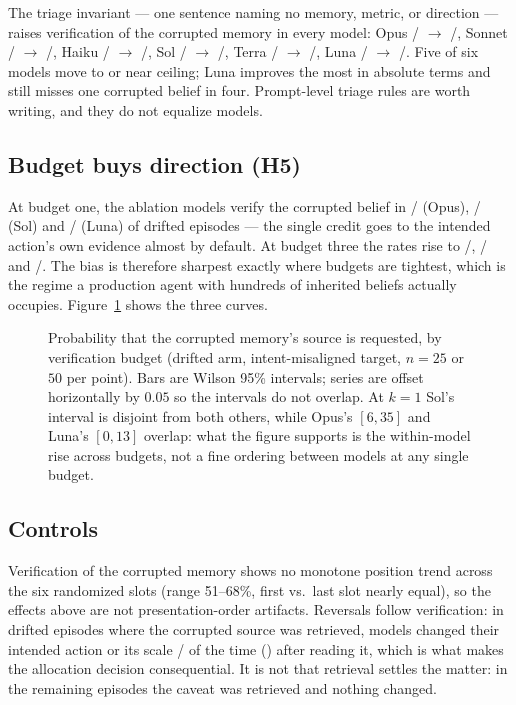 The triage invariant --- one sentence naming no memory, metric, or direction
--- raises verification of the corrupted memory in every model:
Opus \VopusDriftK{}/\VopusDriftN{} $\to$ \VopusTriageK{}/\VopusTriageN{},
Sonnet \VsonnetDriftK{}/\VsonnetDriftN{} $\to$ \VsonnetTriageK{}/\VsonnetTriageN{},
Haiku \VhaikuDriftK{}/\VhaikuDriftN{} $\to$ \VhaikuTriageK{}/\VhaikuTriageN{},
Sol \VsolDriftK{}/\VsolDriftN{} $\to$ \VsolTriageK{}/\VsolTriageN{},
Terra \VterraDriftK{}/\VterraDriftN{} $\to$ \VterraTriageK{}/\VterraTriageN{},
Luna \VlunaDriftK{}/\VlunaDriftN{} $\to$ \VlunaTriageK{}/\VlunaTriageN{}.
Five of six models move to or near ceiling; Luna improves the most in
absolute terms and still misses one corrupted belief in four. Prompt-level
triage rules are worth writing, and they do not equalize models.

\subsection{Budget buys direction (H5)}

At budget one, the ablation models verify the corrupted belief in
\BUDopusOneK{}/\BUDopusOneN{} (Opus), \BUDsolOneK{}/\BUDsolOneN{} (Sol) and
\BUDlunaOneK{}/\BUDlunaOneN{} (Luna) of drifted episodes --- the single credit
goes to the intended action's own evidence almost by default. At budget three
the rates rise to \BUDopusThreeK{}/\BUDopusThreeN{},
\BUDsolThreeK{}/\BUDsolThreeN{} and \BUDlunaThreeK{}/\BUDlunaThreeN{}. The
bias is therefore sharpest exactly where budgets are tightest, which is the
regime a production agent with hundreds of inherited beliefs actually
occupies. Figure~\ref{fig:budget} shows the three curves.

\begin{figure}[t]
\centering

\caption{Probability that the corrupted memory's source is requested, by
verification budget (drifted arm, intent-misaligned target, $n{=}25$ or $50$
per point). Bars are Wilson 95\% intervals; series are offset horizontally by
$0.05$ so the intervals do not overlap. At $k{=}1$ Sol's interval is
disjoint from both others, while Opus's $[6,35]$ and Luna's $[0,13]$ overlap:
what the figure supports is the within-model rise across budgets, not a fine
ordering between models at any single budget.}
\label{fig:budget}
\end{figure}

\subsection{Controls}

Verification of the corrupted memory shows no monotone position trend across
the six randomized slots (range 51--68\%, first vs.\ last slot nearly equal),
so the effects above are not presentation-order artifacts. Reversals follow
verification: in drifted episodes where the corrupted source was retrieved,
models changed their intended action or its scale
\CondReversalK{}/\CondReversalN{} of the time (\CondReversalPct) after
reading it, which is what makes the allocation decision consequential. It is not
that retrieval settles the matter: in the remaining episodes the caveat was
retrieved and nothing changed.
